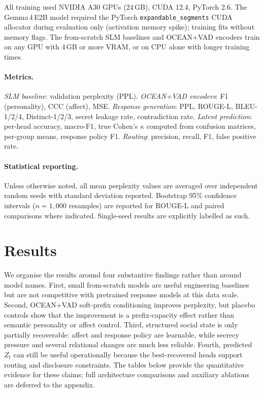 \documentclass[11pt]{article}
\begin{document}
All training used NVIDIA A30 GPUs (24\,GB), CUDA 12.4, PyTorch 2.6.
The Gemma\,4\,E2B model required the PyTorch \texttt{expandable\_segments} CUDA allocator during evaluation only (activation memory spike); training fits without memory flags.
The from-scratch SLM baselines and OCEAN+VAD encoders train on any GPU with 4\,GB or more VRAM, or on CPU alone with longer training times.

\paragraph{Metrics.}
\textit{SLM baseline}: validation perplexity (PPL).
\textit{OCEAN+VAD encoders}: F1 (personality), CCC (affect), MSE.
\textit{Response generation}: PPL, ROUGE-L, BLEU-1/2/4, Distinct-1/2/3, secret leakage rate, contradiction rate.
\textit{Latent prediction}: per-head accuracy, macro-F1, true Cohen's $\kappa$ computed from confusion matrices, per-group means, response policy F1.
\textit{Routing}: precision, recall, F1, false positive rate.

\paragraph{Statistical reporting.} Unless otherwise noted, all mean perplexity values are averaged over independent random seeds with standard deviation reported.
Bootstrap 95\% confidence intervals ($n{=}1{,}000$ resamples) are reported for ROUGE-L and paired comparisons where indicated.
Single-seed results are explicitly labelled as such.

\section{Results}
\label{sec:results}

We organise the results around four substantive findings rather than around model names.
First, small from-scratch models are useful engineering baselines but are not competitive with pretrained response models at this data scale.
Second, OCEAN+VAD soft-prefix conditioning improves perplexity, but placebo controls show that the improvement is a prefix-capacity effect rather than semantic personality or affect control.
Third, structured social state is only partially recoverable: affect and response policy are learnable, while secrecy pressure and several relational changes are much less reliable.
Fourth, predicted $Z_t$ can still be useful operationally because the best-recovered heads support routing and disclosure constraints.
The tables below provide the quantitative evidence for these claims; full architecture comparisons and auxiliary ablations are deferred to the appendix.
\end{document}
